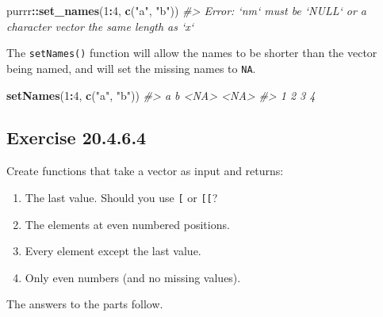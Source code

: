 \documentclass[]{book}
\newenvironment{Shaded}{\begin{snugshade}}{\end{snugshade}}
\newcommand{\CommentTok}[1]{\textcolor[rgb]{0.56,0.35,0.01}{\textit{#1}}}
\newcommand{\DecValTok}[1]{\textcolor[rgb]{0.00,0.00,0.81}{#1}}
\newcommand{\KeywordTok}[1]{\textcolor[rgb]{0.13,0.29,0.53}{\textbf{#1}}}
\newcommand{\NormalTok}[1]{#1}
\newcommand{\OperatorTok}[1]{\textcolor[rgb]{0.81,0.36,0.00}{\textbf{#1}}}
\newcommand{\StringTok}[1]{\textcolor[rgb]{0.31,0.60,0.02}{#1}}
\providecommand{\tightlist}{%
  \setlength{\itemsep}{0pt}\setlength{\parskip}{0pt}}
\theoremstyle{plain}
\theoremstyle{remark}
\begin{document}
\begin{Shaded}
\begin{Highlighting}[]
\NormalTok{purrr}\OperatorTok{::}\KeywordTok{set_names}\NormalTok{(}\DecValTok{1}\OperatorTok{:}\DecValTok{4}\NormalTok{, }\KeywordTok{c}\NormalTok{(}\StringTok{"a"}\NormalTok{, }\StringTok{"b"}\NormalTok{))}
\CommentTok{#> Error: `nm` must be `NULL` or a character vector the same length as `x`}
\end{Highlighting}
\end{Shaded}

The \texttt{setNames()} function will allow the names to be shorter than the vector being
named, and will set the missing names to \texttt{NA}.

\begin{Shaded}
\begin{Highlighting}[]
\KeywordTok{setNames}\NormalTok{(}\DecValTok{1}\OperatorTok{:}\DecValTok{4}\NormalTok{, }\KeywordTok{c}\NormalTok{(}\StringTok{"a"}\NormalTok{, }\StringTok{"b"}\NormalTok{))}
\CommentTok{#>    a    b <NA> <NA> }
\CommentTok{#>    1    2    3    4}
\end{Highlighting}
\end{Shaded}

\hypertarget{exercise-20.4.6.4}{%
\subsection*{\texorpdfstring{Exercise {20.4.6.4}}{Exercise 20.4.6.4}}\label{exercise-20.4.6.4}}

Create functions that take a vector as input and returns:

\begin{enumerate}
\def\labelenumi{\arabic{enumi}.}
\tightlist
\item
  The last value. Should you use \texttt{{[}} or \texttt{{[}{[}}?
\item
  The elements at even numbered positions.
\item
  Every element except the last value.
\item
  Only even numbers (and no missing values).
\end{enumerate}

The answers to the parts follow.
\end{document}
